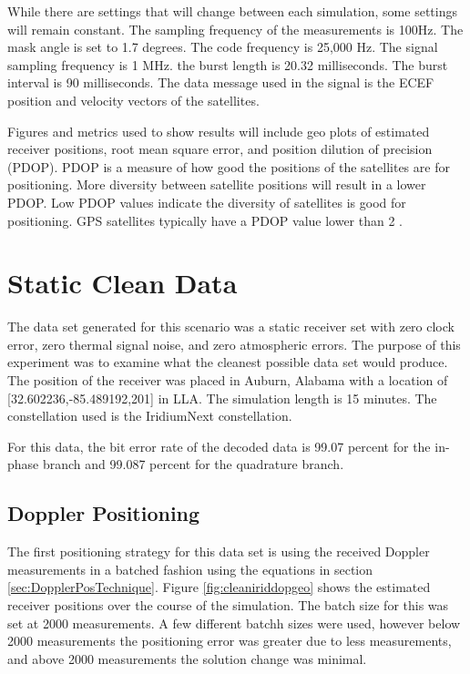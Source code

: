 \documentclass[12pt]{report}
\begin{document}
While there are settings that will change between each simulation, some settings will remain constant. The sampling frequency of the measurements is 100Hz. The mask angle is set to 1.7 degrees. The code frequency is 25,000 Hz. The signal sampling frequency is 1 MHz. the burst length is 20.32 milliseconds. The burst interval is 90 milliseconds. The data message used in the signal is the ECEF position and velocity vectors of the satellites.

Figures and metrics used to show results will include geo plots of estimated receiver positions, root mean square error, and position dilution of precision (PDOP). PDOP is a measure of how good the positions of the satellites are for positioning. More diversity between satellite positions will result in a lower PDOP. Low PDOP values indicate the diversity of satellites is good for positioning. GPS satellites typically have a PDOP value lower than 2 \cite{misraGlobalPositioningSystem2012}. 

\section{Static Clean Data}
The data set generated for this scenario was a static receiver set with zero clock error, zero thermal signal noise, and zero atmospheric errors. The purpose of this experiment was to examine what the cleanest possible data set would produce. The position of the receiver was placed in Auburn, Alabama with a location of [32.602236,-85.489192,201] in LLA. The simulation length is 15 minutes. The constellation used is the IridiumNext constellation. 

For this data, the bit error rate of the decoded data is 99.07 percent for the in-phase branch and 99.087 percent for the quadrature branch. 

\subsection{Doppler Positioning}
The first positioning strategy for this data set is using the received Doppler measurements in a batched fashion using the equations in section \ref{sec:DopplerPosTechnique}. Figure \ref{fig:cleaniriddopgeo} shows the estimated receiver positions over the course of the simulation. The batch size for this was set at 2000 measurements. A few different batchh sizes were used, however below 2000 measurements the positioning error was greater due to less measurements, and above 2000 measurements the solution change was minimal. 
\end{document}
